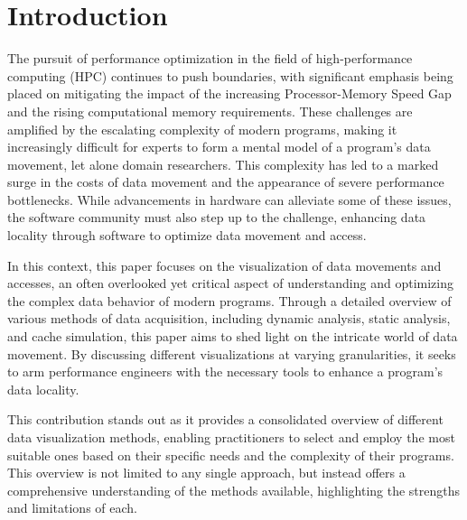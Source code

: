 \section{Introduction}\label{sec:introduction}
The pursuit of performance optimization in the field of high-performance computing (HPC) continues to push boundaries, with significant emphasis being placed on mitigating the impact of the increasing Processor-Memory Speed Gap and the rising computational memory requirements. These challenges are amplified by the escalating complexity of modern programs, making it increasingly difficult for experts to form a mental model of a program's data movement, let alone domain researchers. This complexity has led to a marked surge in the costs of data movement and the appearance of severe performance bottlenecks. While advancements in hardware can alleviate some of these issues, the software community must also step up to the challenge, enhancing data locality through software to optimize data movement and access.

In this context, this paper focuses on the visualization of data movements and accesses, an often overlooked yet critical aspect of understanding and optimizing the complex data behavior of modern programs. Through a detailed overview of various methods of data acquisition, including dynamic analysis, static analysis, and cache simulation, this paper aims to shed light on the intricate world of data movement. By discussing different visualizations at varying granularities, it seeks to arm performance engineers with the necessary tools to enhance a program's data locality.

This contribution stands out as it provides a consolidated overview of different data visualization methods, enabling practitioners to select and employ the most suitable ones based on their specific needs and the complexity of their programs. This overview is not limited to any single approach, but instead offers a comprehensive understanding of the methods available, highlighting the strengths and limitations of each.

